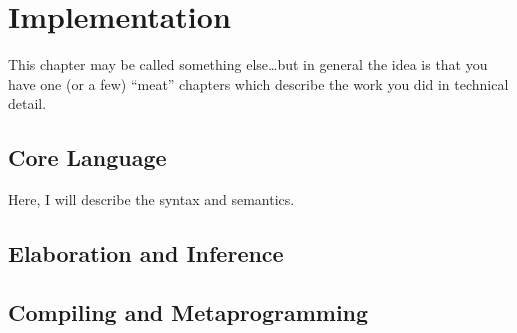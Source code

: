 \chapter{Implementation}

\begin{guidance}
This chapter may be called something else\ldots but in general
the idea is that you have one (or a few) ``meat'' chapters which
describe the work you did in technical detail.
\end{guidance}

\section{Core Language}

Here, I will describe the syntax and semantics.

\section{Elaboration and Inference}

\section{Compiling and Metaprogramming}
